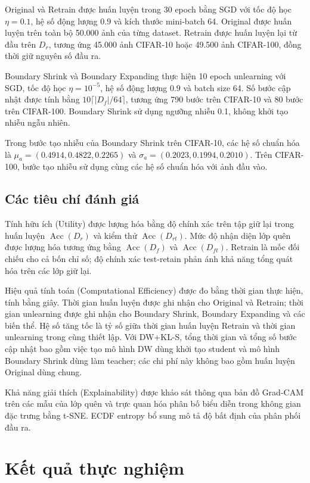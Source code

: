 \documentclass[conference]{IEEEtran}
\begin{document}
Original và Retrain được huấn luyện trong 30 epoch bằng SGD với tốc độ học $\eta=0.1$, hệ số động lượng $0.9$ và kích thước mini-batch 64. Original được huấn luyện trên toàn bộ 50.000 ảnh của từng dataset. Retrain được huấn luyện lại từ đầu trên $D_r$, tương ứng 45.000 ảnh CIFAR-10 hoặc 49.500 ảnh CIFAR-100, đồng thời giữ nguyên số đầu ra.

Boundary Shrink và Boundary Expanding thực hiện 10 epoch unlearning với SGD, tốc độ học $\eta=10^{-5}$, hệ số động lượng $0.9$ và batch size 64. Số bước cập nhật được tính bằng $10\lceil|D_f|/64\rceil$, tương ứng 790 bước trên CIFAR-10 và 80 bước trên CIFAR-100. Boundary Shrink sử dụng ngưỡng nhiễu 0.1, không khởi tạo nhiễu ngẫu nhiên.

Trong bước tạo nhiễu của Boundary Shrink trên CIFAR-10, các hệ số chuẩn hóa là $\mu_a=(0.4914,0.4822,0.2265)$ và $\sigma_a=(0.2023,0.1994,0.2010)$. Trên CIFAR-100, bước tạo nhiễu sử dụng cùng các hệ số chuẩn hóa với ảnh đầu vào.

\subsection{Các tiêu chí đánh giá}
Tính hữu ích (Utility) được lượng hóa bằng độ chính xác trên tập giữ lại trong huấn luyện $\operatorname{Acc}(D_r)$ và kiểm thử $\operatorname{Acc}(D_{rt})$. Mức độ nhận diện lớp quên được lượng hóa tương ứng bằng $\operatorname{Acc}(D_f)$ và $\operatorname{Acc}(D_{ft})$. Retrain là mốc đối chiếu cho cả bốn chỉ số; độ chính xác test-retain phản ánh khả năng tổng quát hóa trên các lớp giữ lại.

Hiệu quả tính toán (Computational Efficiency) được đo bằng thời gian thực hiện, tính bằng giây. Thời gian huấn luyện được ghi nhận cho Original và Retrain; thời gian unlearning được ghi nhận cho Boundary Shrink, Boundary Expanding và các biến thể. Hệ số tăng tốc là tỷ số giữa thời gian huấn luyện Retrain và thời gian unlearning trong cùng thiết lập. Với DW+KL-S, tổng thời gian và tổng số bước cập nhật bao gồm việc tạo mô hình DW dùng khởi tạo student và mô hình Boundary Shrink dùng làm teacher; các chi phí này không bao gồm huấn luyện Original dùng chung.

Khả năng giải thích (Explainability) được khảo sát thông qua bản đồ Grad-CAM trên các mẫu của lớp quên và trực quan hóa phân bố biểu diễn trong không gian đặc trưng bằng t-SNE. ECDF entropy bổ sung mô tả độ bất định của phân phối đầu ra.

\section{Kết quả thực nghiệm}
\end{document}
